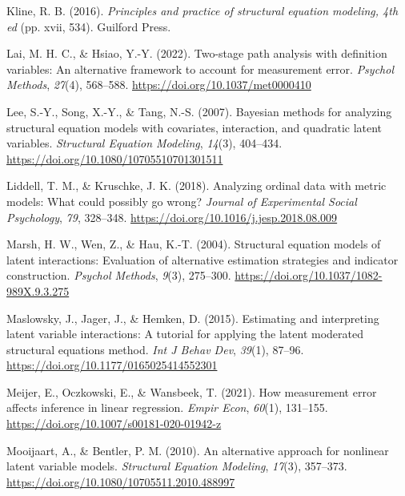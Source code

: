 \documentclass[
  man]{apa6}
\newlength{\cslhangindent}
\newlength{\cslentryspacingunit} %
\newenvironment{CSLReferences}[2] %
 {%
  \setlength{\parindent}{0pt}
  \ifodd #1
  \let\oldpar\par
  \def\par{\hangindent=\cslhangindent\oldpar}
  \fi
  \setlength{\parskip}{#2\cslentryspacingunit}
 }%
 {}
\begin{document}
\begin{CSLReferences}{1}{0}
\leavevmode{}%
Kline, R. B. (2016). \emph{Principles and practice of structural equation modeling, 4th ed} (pp. xvii, 534). Guilford Press.

\leavevmode{}%
Lai, M. H. C., \& Hsiao, Y.-Y. (2022). Two-stage path analysis with definition variables: {An} alternative framework to account for measurement error. \emph{Psychol Methods}, \emph{27}(4), 568--588. \url{https://doi.org/10.1037/met0000410}

\leavevmode{}%
Lee, S.-Y., Song, X.-Y., \& Tang, N.-S. (2007). Bayesian methods for analyzing structural equation models with covariates, interaction, and quadratic latent variables. \emph{Structural Equation Modeling}, \emph{14}(3), 404--434. \url{https://doi.org/10.1080/10705510701301511}

\leavevmode{}%
Liddell, T. M., \& Kruschke, J. K. (2018). Analyzing ordinal data with metric models: {What} could possibly go wrong? \emph{Journal of Experimental Social Psychology}, \emph{79}, 328--348. \url{https://doi.org/10.1016/j.jesp.2018.08.009}

\leavevmode{}%
Marsh, H. W., Wen, Z., \& Hau, K.-T. (2004). Structural equation models of latent interactions: Evaluation of alternative estimation strategies and indicator construction. \emph{Psychol Methods}, \emph{9}(3), 275--300. \url{https://doi.org/10.1037/1082-989X.9.3.275}

\leavevmode{}%
Maslowsky, J., Jager, J., \& Hemken, D. (2015). Estimating and interpreting latent variable interactions: {A} tutorial for applying the latent moderated structural equations method. \emph{Int J Behav Dev}, \emph{39}(1), 87--96. \url{https://doi.org/10.1177/0165025414552301}

\leavevmode{}%
Meijer, E., Oczkowski, E., \& Wansbeek, T. (2021). How measurement error affects inference in linear regression. \emph{Empir Econ}, \emph{60}(1), 131--155. \url{https://doi.org/10.1007/s00181-020-01942-z}

\leavevmode{}%
Mooijaart, A., \& Bentler, P. M. (2010). An alternative approach for nonlinear latent variable models. \emph{Structural Equation Modeling}, \emph{17}(3), 357--373. \url{https://doi.org/10.1080/10705511.2010.488997}


\end{CSLReferences}
\end{document}
